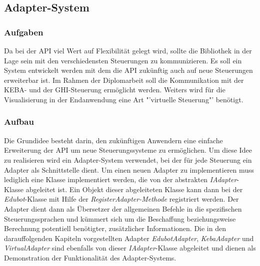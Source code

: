 
\subsection{Adapter-System}

\subsubsection{Aufgaben}
Da bei der API viel Wert auf Flexibilität gelegt wird, sollte die Bibliothek in der Lage sein mit den verschiedensten Steuerungen zu kommunizieren. Es soll ein System entwickelt werden mit dem die API zukünftig auch auf neue Steuerungen erweiterbar ist. Im Rahmen der Diplomarbeit soll die Kommunikation mit der KEBA- und der GHI-Steuerung ermöglicht werden. Weiters wird für die Visualisierung in der Endanwendung eine Art "'virtuelle Steuerung"' benötigt.
\subsubsection{Aufbau}
Die Grundidee besteht darin, den zukünftigen Anwendern eine einfache Erweiterung der API um neue Steuerungssysteme zu ermöglichen. Um diese Idee zu realisieren wird ein Adapter-System verwendet, bei der für jede Steuerung ein Adapter als Schnittstelle dient. Um einen neuen Adapter zu implementieren muss lediglich eine Klasse implementiert werden, die von der abstrakten \textit{IAdapter}-Klasse abgeleitet ist. Ein Objekt dieser abgeleiteten Klasse kann dann bei der \textit{Edubot}-Klasse mit Hilfe der \textit{RegisterAdapter-Methode} registriert werden. Der Adapter dient dann als Übersetzer der allgemeinen Befehle in die spezifischen Steuerungssprachen und kümmert sich um die Beschaffung beziehungsweise Berechnung potentiell benötigter, zusätzlicher Informationen. Die in den darauffolgenden Kapiteln vorgestellten Adapter  \textit{EdubotAdapter}, \textit{KebaAdapter} und \textit{VirtualAdapter} sind ebenfalls von dieser \textit{IAdapter}-Klasse abgeleitet und dienen als Demonstration der Funktionalität des Adapter-Systems. 
